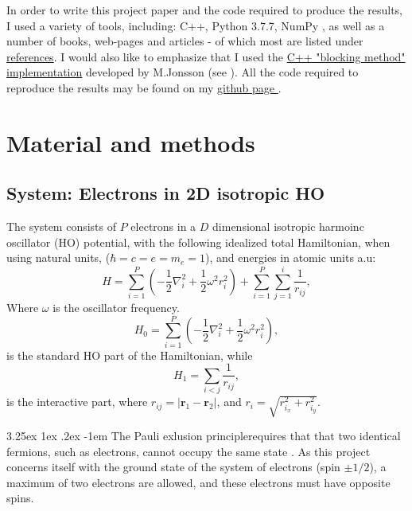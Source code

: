\documentclass[%
oneside,                 %
final,                   %
10pt]{article}
\makeatletter
\renewcommand\paragraph{\@startsection{paragraph}{5}{\z@}%
  {3.25ex \@plus1ex \@minus.2ex}%
  {-1em}%
  {\normalfont\normalsize\bfseries}}
\makeatother
\begin{document}
 
In order to write this project paper and the code required to produce the results, I used a variety of tools, including: C++, Python 3.7.7, NumPy \cite{numpy}, as well as a number of books, web-pages and articles - of which most are listed under \hyperref[refer]{references}. I would also like to emphasize that I used the \href{https://github.com/computative/block?fbclid=IwAR0_O5IXQHeKxK5TxNIWdNgSTWYZSHjt3qt5gJc57Cu5v5pTUiHBkHI3ciY}{C++ "blocking method" implementation} developed by M.Jonsson (see \cite{Jonsson}). All the code required to reproduce the results may be found on my \href{https://github.com/johanere/FYS4411}{github page }.  
 
 

\section{Material and methods} \label{theory}


\subsection{System: Electrons in 2D isotropic HO}
The system consists of $P$ electrons in a $D$ dimensional isotropic harmoinc oscillator (HO) potential, with the following idealized total Hamiltonian, when using natural units, ($\hbar=c=e=m_e=1$), and energies in  atomic units a.u:
\begin{equation}
\label{eq:finalH}
H=\sum_{i=1}^{P} \left(  -\frac{1}{2} \nabla_i^2 + \frac{1}{2} \omega^2r_i^2  \right)+\sum_{i=1}^P \sum_{j=1}^i \frac{1}{r_{ij}},
\end{equation}
Where $\omega$ is the oscillator frequency. 
\begin{equation*}
H_0=\sum_{i=1}^{P} \left(  -\frac{1}{2} \nabla_i^2 + \frac{1}{2} \omega^2r_i^2  \right),
\end{equation*}
is the standard HO part of the Hamiltonian, while
\begin{equation*}
H_1=\sum_{i<j}\frac{1}{r_{ij}},
\end{equation*}
is the interactive part, where $r_{ij}=\vert \bm{r}_1-\bm{r}_2\vert$, and $r_i = \sqrt{r_{i_x}^2+r_{i_y}^2}$.

\paragraph{The Pauli exlusion principle}requires that that two identical fermions, such as electrons, cannot occupy the same state \citep{Griffiths95}. As this project concerns itself with the ground state of the system of electrons (spin $\pm 1/2$), a maximum of two electrons are allowed, and these electrons must have opposite spins. 
\end{document}
